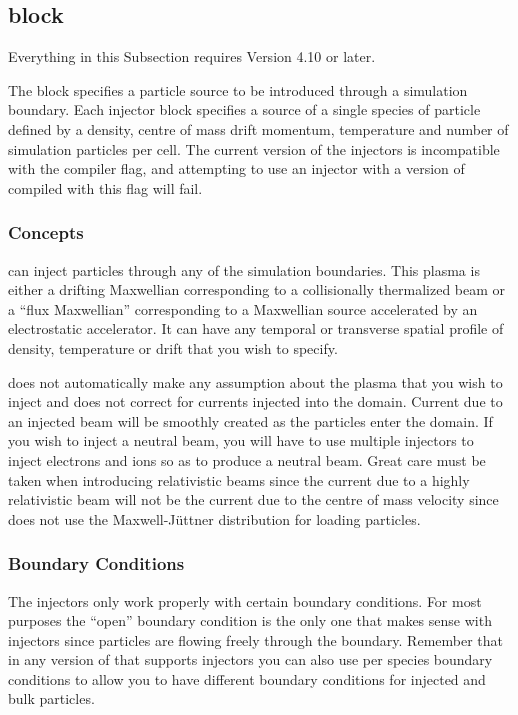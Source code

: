 \subsection{ block}
\label{sec:injector_block}

{\emphtext
Everything in this Subsection requires {\EPOCH} Version 4.10 or later.}

The  block specifies a particle source to be introduced
through a simulation boundary. Each injector block specifies a source of a
single species of particle defined by a density, centre of mass drift momentum,
temperature and number of simulation particles per cell. The current version
of the injectors is incompatible with the 
compiler flag, and attempting to use an injector with a version of {\EPOCH}
compiled with this flag will fail.

\subsubsection{Concepts}

{\EPOCH} can inject particles through any of the simulation boundaries. This
plasma is either a drifting Maxwellian corresponding to a collisionally
thermalized beam or a ``flux Maxwellian'' corresponding to a Maxwellian source
accelerated by an electrostatic accelerator. It can have any temporal or
transverse spatial profile of density, temperature or drift that you wish to
specify.

{\EPOCH} does not automatically make any assumption about the plasma that you
wish to inject and does not correct for currents injected into the domain.
Current due to an injected beam will be smoothly created as the particles enter
the domain. If you wish to inject a neutral beam, you will have to use multiple
injectors to inject electrons and ions so as to produce a neutral beam. Great
care must be taken when introducing relativistic beams since the current due
to a highly relativistic beam will not be the current due to the centre of mass
velocity since {\EPOCH} does not use the Maxwell-J\"{u}ttner distribution for
loading particles.

\subsubsection{Boundary Conditions}

The injectors only work properly with certain boundary conditions. For most
purposes the ``open'' boundary condition is the only one that makes sense with
injectors since particles are flowing freely through the boundary. Remember
that in any version of {\EPOCH} that supports injectors you can also use per
species boundary conditions to allow you to have different boundary conditions
for injected and bulk particles.


